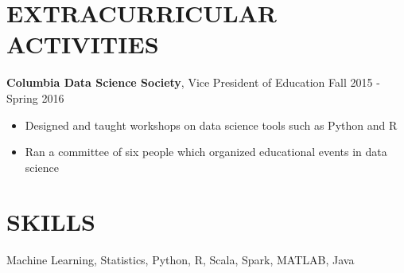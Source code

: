 \documentclass{res}
\begin{document}
\begin{resume}
\begin{comment}
\textbf{Columbia University Departments of Mathematics and Statistics}, New York, NY
  \\ \textit{Undergraduate Teaching Assistant}\hfill Spring 2014 - Spring 2016
\begin{itemize}
\item Held regular office hours for calculus, linear algebra, and statistics students
\item Evaluated assignments and provided feedback to students
\end{itemize}
\end{comment}


\section{EXTRACURRICULAR ACTIVITIES}
	\textbf{Columbia Data Science Society}, Vice President of Education \hfill Fall 2015 - Spring 2016
	\begin{itemize}
	\item Designed and taught workshops on data science tools such as Python and R
	\item Ran a committee of six people which organized educational events in data science
	\end{itemize}
\begin{comment}	
	\textbf{Personal Projects} (On Github)
	\begin{itemize}
	\item Qlearning: Implementation of deep reinforcement learning algorithms
	\item brownian: Simulation of Brownian motion and general stochastic differential equations
	\item memm\_tagging: Implementation of a Maximum Entropy Markov Model 
	\end{itemize}
\end{comment}
\section{SKILLS}
	Machine Learning, Statistics, Python, R, Scala, Spark, MATLAB, Java


\end{resume}
\end{document}

